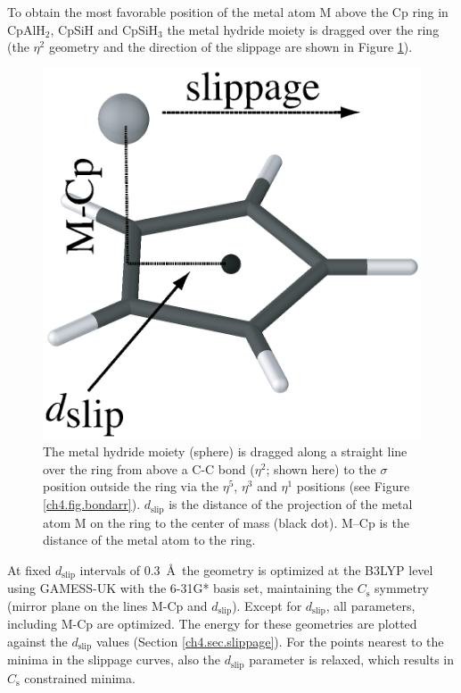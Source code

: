 To obtain the most favorable position of the metal atom M above the Cp ring in CpAlH$_2$, CpSiH and CpSiH$_3$ the metal hydride moiety is dragged over the ring (the $\eta^2$ geometry and the direction of the slippage are shown in Figure \ref{ch4.fig.slip}).
\begin{figure}[hbtp]
\center
\includegraphics[scale=0.3]{cyclopentadienyl/figures/verloop.eps}
\caption{The metal hydride moiety (sphere) is dragged along a straight line over the ring from above a C-C bond ($\eta^2$; shown here) to the $\sigma$ position outside the ring via the $\eta^5$, $\eta^3$ and $\eta^1$ positions (see Figure \ref{ch4.fig.bondarr}).  $d_\mathrm{slip}$ is the distance of the projection of the metal atom M on the ring to the center of mass (black dot). M--Cp is the distance of the metal atom to the ring.}
\label{ch4.fig.slip}
\end{figure}
At fixed $d_\mathrm{slip}$ intervals of 0.3~\AA\  the geometry is optimized at the B3LYP level \cite{b3,lyp} using GAMESS-UK \cite{gamess} with the \mbox{6-31G*} basis set, maintaining the $C_\mathrm{s}$ symmetry (mirror plane on the lines M-Cp and $d_\mathrm{slip}$). Except for $d_\mathrm{slip}$, all parameters, including M-Cp are optimized. The energy for these geometries are plotted against the $d_\mathrm{slip}$ values (Section \ref{ch4.sec.slippage}). For the points nearest to the minima in the slippage curves, also the $d_\mathrm{slip}$ parameter is relaxed, which results in $C_\mathrm{s}$ constrained minima.

